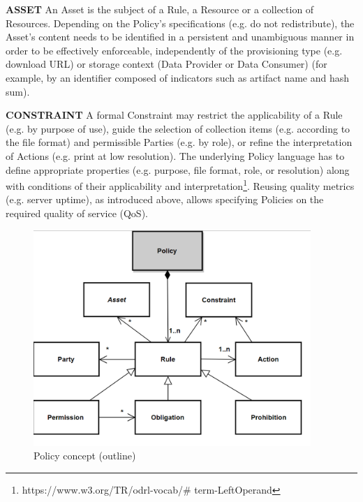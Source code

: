 \textbf{ASSET }An Asset is the subject of a Rule, a Resource or a collection of Resources. Depending on the Policy’s specifications (e.g. do not redistribute), the Asset’s content needs to be identified in a persistent and unambiguous manner in order to be effectively enforceable, independently of the provisioning type (e.g. download URL) or storage context (Data Provider or Data Consumer) (for example, by an identifier composed of indicators such as artifact name and hash sum).

\textbf{CONSTRAINT} A formal Constraint may restrict the applicability of a Rule (e.g. by purpose of use), guide the selection of collection items (e.g. according to the file format) and permissible Parties (e.g. by role), or refine the interpretation of Actions (e.g. print at low resolution). The underlying Policy language has to define appropriate properties (e.g. purpose, file format, role, or resolution) along with conditions of their applicability and interpretation\footnote{https://www.w3.org/TR/odrl-vocab/$\#$ term-LeftOperand }. Reusing quality metrics (e.g. server uptime), as introduced above, allows specifying Policies on the required quality of service (QoS). 




\begin{figure}[H]
	\begin{Center}
		\includegraphics[width=4.14in,height=3.22in]{./media/image46.png}
		\caption{Policy concept (outline)}
		\label{fig:Policy_concept_outline}
	\end{Center}
\end{figure}





